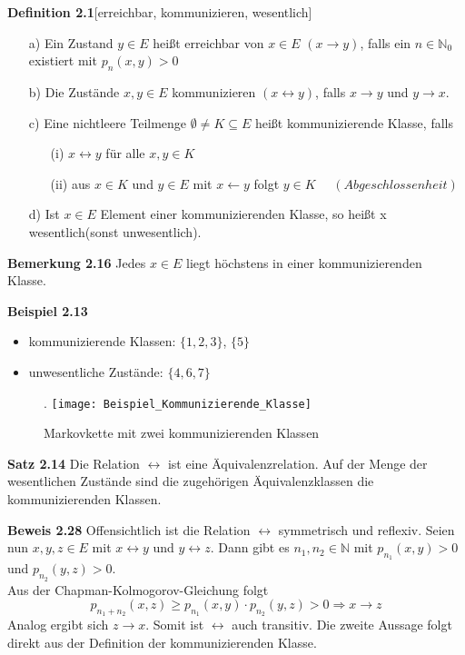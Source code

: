 \textbf{Definition 2.1}[erreichbar, kommunizieren, wesentlich]
\mbox{}
\begin{itemize}
\item[a)] Ein Zustand $y \in E$ heißt erreichbar von $x \in E$ $(x \rightarrow y)$, falls ein $n \in \mathbb{N}_{0}$ existiert mit $p_{n}(x,y)>0$
\item[b)] Die Zustände $x,y \in E$ kommunizieren $(x\leftrightarrow y)$, falls $x \rightarrow y$ und $y \rightarrow x$. 
\item[c)] Eine nichtleere Teilmenge $\emptyset \neq K \subseteq E$ heißt kommunizierende Klasse, falls
\begin{itemize}
\item[(i)] $x \leftrightarrow y$ für alle $x,y \in K$
\item[(ii)] aus $x \in K$ und $y \in E$ mit $x \leftarrow y$ folgt $y \in K$ $\quad (Abgeschlossenheit)$
\end{itemize}
\item[d)] Ist $x \in E$ Element einer kommunizierenden Klasse, so heißt x wesentlich(sonst unwesentlich).
\end{itemize}

\textbf{Bemerkung 2.16}
Jedes $x \in E$ liegt höchstens in einer kommunizierenden Klasse. 

\textbf{Beispiel 2.13}
\mbox{}
\begin{itemize}
\item kommunizierende Klassen: $\lbrace 1,2,3 \rbrace$, $\lbrace 5 \rbrace$
\item unwesentliche Zustände: $\lbrace 4,6,7 \rbrace$
\end{itemize}
\begin{figure}[H].
\centering
\texttt{[image: Beispiel\_Kommunizierende\_Klasse]}
\caption{Markovkette mit zwei kommunizierenden Klassen}
\end{figure}
\noindent

\textbf{Satz 2.14}
Die Relation $\leftrightarrow$ ist eine Äquivalenzrelation. Auf der Menge der wesentlichen Zustände sind die zugehörigen Äquivalenzklassen die kommunizierenden Klassen.

\textbf{Beweis 2.28}
Offensichtlich ist die Relation $\leftrightarrow$ symmetrisch und reflexiv. Seien nun $x,y,z \in E$ mit $x \leftrightarrow y$ und $y \leftrightarrow z$. Dann gibt es $n_{1},n_{2} \in \mathbb{N}$ mit $p_{n_{1}}(x,y)>0$ und $p_{n_{2}}(y,z)>0$.
\\
Aus der Chapman-Kolmogorov-Gleichung folgt
\begin{equation*}
p_{n_{1} + n_{2}}(x,z) \geq p_{n_{1}}(x,y) \cdot p_{n_{2}}(y,z) > 0 \Rightarrow x \rightarrow z
\end{equation*}
Analog ergibt sich $z \rightarrow x$. Somit ist $\leftrightarrow$ auch transitiv. Die zweite Aussage folgt direkt aus der Definition der kommunizierenden Klasse.


